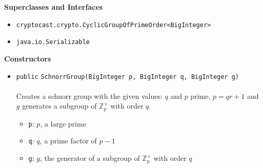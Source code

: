 \textbf{\sffamily Superclasses and Interfaces}
\begin{itemize}
\item \lstinline|cryptocast.crypto.CyclicGroupOfPrimeOrder<BigInteger>|
\item \lstinline|java.io.Serializable|
\end{itemize}


\textbf{\sffamily Constructors}
\begin{itemize}
\item \lstinline|public| \lstinline|SchnorrGroup|\lstinline|(BigInteger p, BigInteger q, BigInteger g)|\\ \\[-0.6em]
Creates a schnorr group with the given values:
 $q$ and $p$ prime, $p = qr + 1$ and $g$ generates
 a subgroup of $\mathbb{Z}_p^\times$ with order $q$.
\begin{itemize}
\item \lstinline|p|: $p$, a large prime
\item \lstinline|q|: $q$, a prime factor of $p - 1$
\item \lstinline|g|: $g$, the generator of a subgroup of $\mathbb{Z}_p^\times$
          with order $q$
\end{itemize}



\end{itemize}


